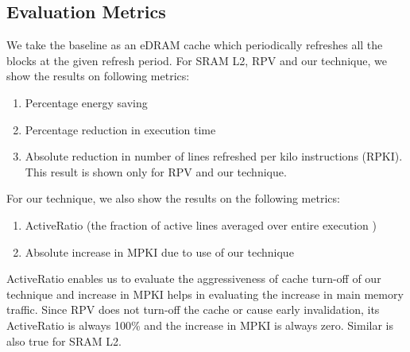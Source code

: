 \subsection{Evaluation Metrics}
We take the baseline as an eDRAM cache which periodically refreshes all the 
blocks at the given refresh period. For SRAM L2, RPV and our technique, we show 
the results on following metrics:
\begin{enumerate}
\item Percentage energy saving
\item  Percentage  reduction in execution time
\item Absolute reduction in number of lines refreshed per kilo instructions 
(RPKI). This result is shown only for RPV and our technique.  
\end{enumerate}
For our technique, we also show the results on the following metrics:
\begin{enumerate}
\item ActiveRatio (the fraction of active lines averaged over entire execution 
\cite{mittal2013PhDThesis}) 
\item Absolute increase in MPKI due to use of our technique
\end{enumerate}

 ActiveRatio enables us to evaluate the aggressiveness of cache turn-off of our technique and increase in MPKI helps in evaluating the increase in main memory traffic. Since RPV does not turn-off the cache or cause early invalidation, its ActiveRatio is always 100\% and the increase in MPKI is always zero. Similar is also true for SRAM L2. 
 

 
 

 

  
  
  
  
  
 
 










 
 








 
 
 



















